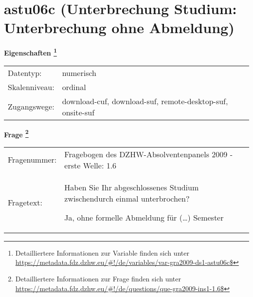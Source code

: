 
    \setcounter{footnote}{0}

    \vspace*{-1.8cm}
	\section{astu06c (Unterbrechung Studium: Unterbrechung ohne Abmeldung)}
	\label{section:astu06c}



    \vspace*{0.5cm}
    \noindent\textbf{Eigenschaften
	\footnote{Detailliertere Informationen zur Variable finden sich unter
		\url{https://metadata.fdz.dzhw.eu/\#!/de/variables/var-gra2009-ds1-astu06c$}}}\\
	\begin{tabularx}{\hsize}{@{}lX}
	Datentyp: & numerisch \\
	Skalenniveau: & ordinal \\
	Zugangswege: &
	  download-cuf, 
	  download-suf, 
	  remote-desktop-suf, 
	  onsite-suf
 \\
    \end{tabularx}



				\vspace*{0.5cm}
                \noindent\textbf{Frage
	                \footnote{Detailliertere Informationen zur Frage finden sich unter
		              \url{https://metadata.fdz.dzhw.eu/\#!/de/questions/que-gra2009-ins1-1.6$}}}\\
				\begin{tabularx}{\hsize}{@{}lX}
					Fragenummer: &
					  Fragebogen des DZHW-Absolventenpanels 2009 - erste Welle:
					  1.6
 \\
					Fragetext: & Haben Sie Ihr abgeschlossenes Studium zwischendurch einmal unterbrochen?\par  Ja, ohne formelle Abmeldung für (…) Semester \\
				\end{tabularx}





